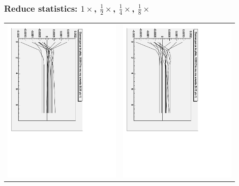 \documentclass[compress]{beamer}
\begin{document}
\begin{frame}
\frametitle{Reduce statistics: $1\times$, $\frac{1}{2}\times$, $\frac{1}{4}\times$, $\frac{1}{8}\times$}
\begin{center}
\begin{tabular}{p{0.45\linewidth} p{0.45\linewidth}}
\includegraphics[height=\linewidth, angle=90]{phiz_conv_2000.pdf} &
\includegraphics[height=\linewidth, angle=90]{phiz_conv_1000.pdf} \\

\end{tabular}
\end{center}
\end{frame}
\end{document}
